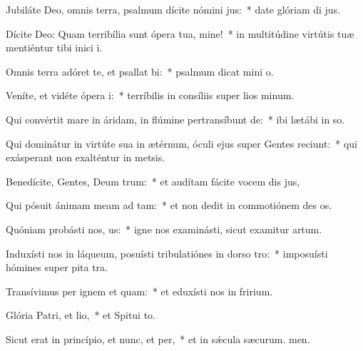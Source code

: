 \item Jubiláte Deo, omnis terra, psalmum dícite nómini jus:~* date glóriam di jus.
\item Dícite Deo: Quam terribília sunt ópera tua, mine!~* in multitúdine virtútis tuæ mentiéntur tibi inici i.
\item Omnis terra adóret te, et psallat bi:~* psalmum dicat mini o.
\item Veníte, et vidéte ópera i:~* terríbilis in consíliis super lios minum.
\item Qui convértit mare in áridam, in flúmine pertransíbunt de:~* ibi lætábi in so.
\item Qui dominátur in virtúte sua in ætérnum, óculi ejus super Gentes reciunt:~* qui exásperant non exalténtur in metsis.
\item Benedícite, Gentes, Deum trum:~* et audítam fácite vocem dis jus,
\item Qui pósuit ánimam meam ad tam:~* et non dedit in commotiónem des os.
\item Quóniam probásti nos, us:~* igne nos examinásti, sicut examitur artum.
\item Induxísti nos in láqueum, posuísti tribulatiónes in dorso tro:~* imposuísti hómines super pita tra.
\item Transívimus per ignem et quam:~* et eduxísti nos in fririum.
\item Glória Patri, et lio,~* et Spitui to.
\item Sicut erat in princípio, et nunc, et per,~* et in sǽcula sæcurum. men.
